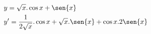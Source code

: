 \begin{ex}
\begin{align}
&y=\sqrt{x}.\cos{x}+\sen{x}\nonumber\\
&y'=\frac{1}{2\sqrt{x}}.\cos{x}+\sqrt{x}.\sen{x}+\cos{x}.2\sen{x}\nonumber
\end{align}
\end{ex}